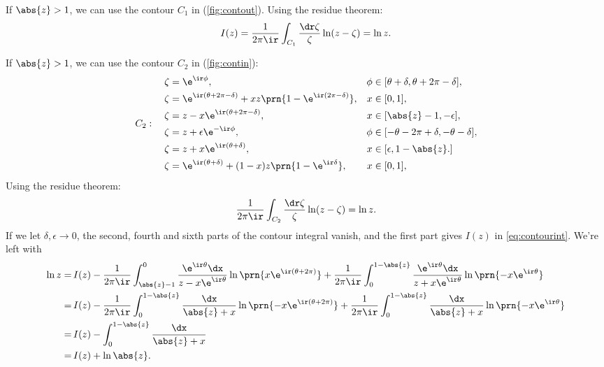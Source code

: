 \documentclass[12pt]{article}
\begin{document}
If $\abs{z}>1$, we can use the contour $C_1$ in (\ref{fig:contout}).
Using the residue theorem:
%
\begin{equation}\label{eq:intout}
  I(z) = \frac{1}{2\pi\ir}\int_{C_1} \frac{\dr\zeta}{\zeta} \ln(z-\zeta) = \ln z.
\end{equation}
%

If $\abs{z}>1$, we can use the contour $C_2$ in (\ref{fig:contin}):
%
\begin{equation}\label{eq:contout}
C_2: \quad
  \begin{aligned}
    \zeta &= \e^{\ir\phi},                             & \phi &\in [\theta+\delta,\theta+2\pi-\delta], \\
    \zeta &= \e^{\ir(\theta+2\pi-\delta)}+xz\prn{1-\e^{\ir(2\pi-\delta)}},
                                                       & x    &\in [0,1], \\
    \zeta &= z - x \e^{\ir(\theta+2\pi-\delta)}, \quad & x    &\in [\abs{z}-1,-\epsilon], \\
    \zeta &= z + \epsilon\e^{-\ir\phi},                & \phi &\in [-\theta-2\pi+\delta,-\theta-\delta], \\
    \zeta &= z + x \e^{\ir(\theta+\delta)},          & x    &\in [\epsilon,1-\abs{z}.] \\
    \zeta &= \e^{\ir(\theta+\delta)}+(1-x)z\prn{1-\e^{\ir\delta}},
                                                       & x    &\in [0,1], \\
  \end{aligned}
\end{equation}
%
Using the residue theorem:
%
\begin{equation}\label{eq:intin}
  \frac{1}{2\pi\ir}\int_{C_2} \frac{\dr\zeta}{\zeta} \ln(z-\zeta) = \ln z.
\end{equation}
%
If we let $\delta,\epsilon\to0$, the second, fourth and sixth parts of the contour integral vanish, and the first part gives $I(z)$ in \eqref{eq:contourint}.
We're left with
%
\begin{equation}\label{eq:intinlim}
  \begin{aligned}
    \ln z =&\, I(z)
           -\frac{1}{2\pi\ir} \int_{\abs{z}-1}^{0} \frac{\e^{\ir\theta}\dx}{z-x\e^{\ir\theta}} \ln\prn{x\e^{\ir(\theta+2\pi)}} %
           +\frac{1}{2\pi\ir} \int_{0}^{1-\abs{z}} \frac{\e^{\ir\theta}\dx}{z+x\e^{\ir\theta}} \ln\prn{-x\e^{\ir\theta}}  \\
      =&\, I(z)
           -\frac{1}{2\pi\ir} \int_{0}^{1-\abs{z}} \frac{\dx}{\abs{z}+x} \ln\prn{-x\e^{\ir(\theta+2\pi)}} %
           +\frac{1}{2\pi\ir} \int_{0}^{1-\abs{z}} \frac{\dx}{\abs{z}+x} \ln\prn{-x\e^{\ir\theta}}  \\
      =&\, I(z) - \int_{0}^{1-\abs{z}} \frac{\dx}{\abs{z}+x}  \\
      =&\, I(z) + \ln\abs{z}.
  \end{aligned}
\end{equation}
%
\end{document}
